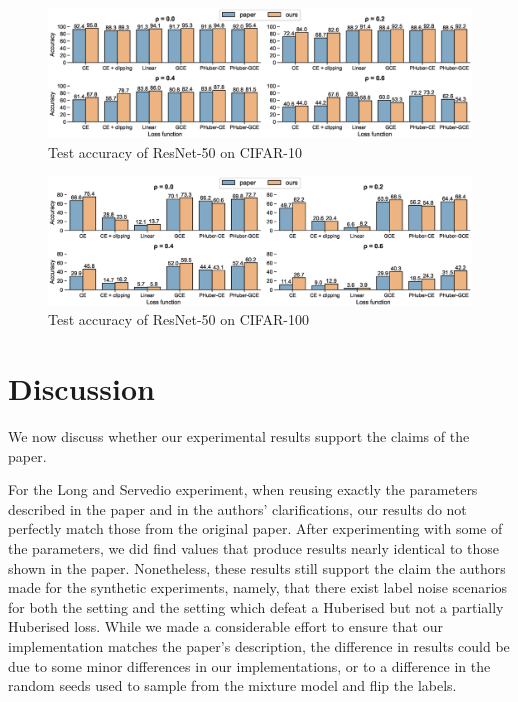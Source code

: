 \begin{figure}[htbp]
  \centering
  \includegraphics[width=\columnwidth]{figs/cifar10.eps}
  \caption{Test accuracy of ResNet-50 on CIFAR-10}
  \label{fig:cifar10-comparison}
\end{figure}
\vspace{-2mm}

\begin{figure}[!h]
  \centering
  \includegraphics[width=\columnwidth]{figs/cifar100.eps}
  \caption{Test accuracy of ResNet-50 on CIFAR-100}
  \label{fig:cifar100-comparison}
\end{figure}

\section{Discussion}
\label{sec:discussion}

We now discuss whether our experimental results support the claims of the paper. 

For the Long and Servedio experiment, when reusing exactly the parameters described in the paper and in the authors' clarifications, our results do not perfectly match those from the original paper. After experimenting with some of the parameters, we did find values that produce results nearly identical to those shown in the paper. Nonetheless, these results still support the claim the authors made for the synthetic experiments, namely, that there exist label noise scenarios for both the \textcite{long_random_2010} setting and the \textcite{ding_statistical_2013} setting which defeat a Huberised but not a partially Huberised loss. While we made a considerable effort to ensure that our implementation matches the paper's description, the difference in results could be due to some minor differences in our implementations, or to a difference in the random seeds used to sample from the mixture model and flip the labels.

